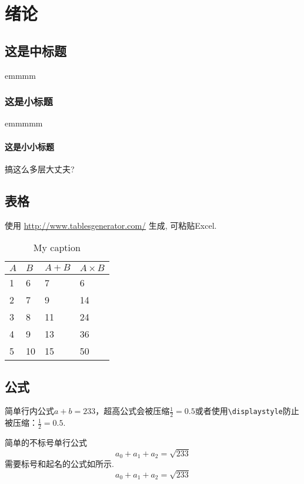 \chapter{绪论}
\section{这是中标题}
emmmm
\subsection{这是小标题}
emmmmm
\subsubsection{这是小小标题}
搞这么多层大丈夫?

\section{表格}

使用 \href{http://www.tablesgenerator.com/}{http://www.tablesgenerator.com/} 生成, 可粘贴Excel.

\begin{table}[!h]
    \centering
    \caption{My caption}
    \label{my-label}
    \begin{tabular}{@{}llll@{}}
        \toprule
        $A$ & $B$ & $A+B$ & $A\times B$ \\ \midrule
        1   & 6   & 7     & 6           \\
        2   & 7   & 9     & 14          \\
        3   & 8   & 11    & 24          \\
        4   & 9   & 13    & 36          \\
        5   & 10  & 15    & 50          \\ \bottomrule
    \end{tabular}
\end{table}

\section{公式}
简单行内公式$a+b=233$，超高公式会被压缩$\frac{1}{2}=0.5$或者使用\lstinline`\displaystyle`防止被压缩：$\displaystyle \frac{1}{2}=0.5$.

简单的不标号单行公式
$$a_0+a_1+a_2=\sqrt{233}$$
需要标号和起名的公式如所示.
\begin{equation}
\label{eqtest}
a_0+a_1+a_2=\sqrt{233}
\end{equation}

